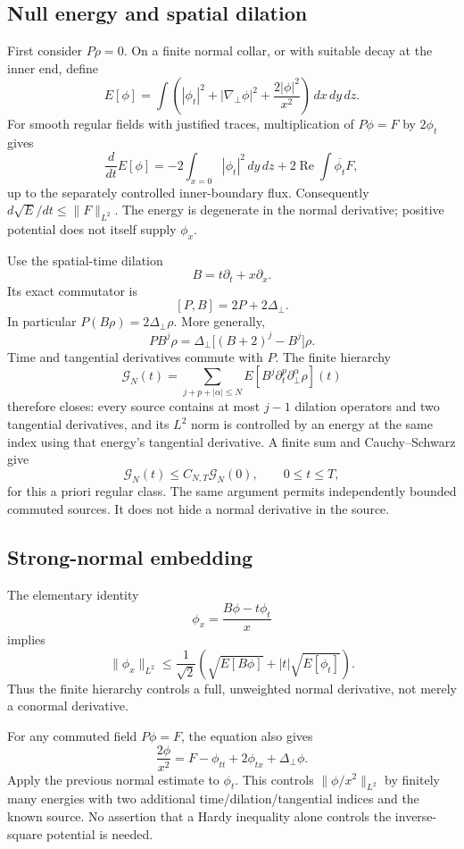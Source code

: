 \subsection{Null energy and spatial dilation}

First consider $P\rho=0$.  On a finite normal collar, or with suitable decay at
the inner end, define
\[
 E[\phi]=\int\left(|\phi_t|^2+|\nabla_\perp\phi|^2+
 \frac{2|\phi|^2}{x^2}\right)\,dx\,dy\,dz.
\]
For smooth regular fields with justified traces, multiplication of
$P\phi=F$ by $2\phi_t$ gives
\[
 \frac{d}{dt}E[\phi]
 =-2\int_{x=0}|\phi_t|^2\,dy\,dz
 +2\operatorname{Re}\int\overline{\phi_t}F,
\]
up to the separately controlled inner-boundary flux.  Consequently
$d\sqrt E/dt\leq\|F\|_{L^2}$.  The energy is degenerate in the normal
derivative; positive potential does not itself supply $\phi_x$.

Use the spatial-time dilation
\[
 B=t\partial_t+x\partial_x.
\]
Its exact commutator is
\[
 [P,B]=2P+2\Delta_\perp.
\]
In particular $P(B\rho)=2\Delta_\perp\rho$.  More generally,
\[
 P B^j\rho=\Delta_\perp\big[(B+2)^j-B^j\big]\rho.
\]
Time and tangential derivatives commute with $P$.  The finite hierarchy
\begin{equation}
 \mathcal G_N(t)=
 \sum_{j+p+|\alpha|\leq N}
 E[B^j\partial_t^p\partial_\perp^\alpha\rho](t)
 \label{eq:original-reference-graph-norm}
\end{equation}
therefore closes: every source contains at most $j-1$ dilation operators and
two tangential derivatives, and its $L^2$ norm is controlled by an energy at
the same index using that energy's tangential derivative.  A finite sum and
Cauchy--Schwarz give
\[
 \mathcal G_N(t)\leq C_{N,T}\mathcal G_N(0),\qquad 0\leq t\leq T,
\]
for this a priori regular class.  The same argument permits independently
bounded commuted sources.  It does not hide a normal derivative in the source.

\subsection{Strong-normal embedding}

The elementary identity
\[
 \phi_x=\frac{B\phi-t\phi_t}{x}
\]
implies
\[
 \|\phi_x\|_{L^2}\leq\frac1{\sqrt2}
 \left(\sqrt{E[B\phi]}+|t|\sqrt{E[\phi_t]}\right).
\]
Thus the finite hierarchy controls a full, unweighted normal derivative, not
merely a conormal derivative.

For any commuted field $P\phi=F$, the equation also gives
\[
 \frac{2\phi}{x^2}=F-\phi_{tt}+2\phi_{tx}+\Delta_\perp\phi.
\]
Apply the previous normal estimate to $\phi_t$.  This controls
$\|\phi/x^2\|_{L^2}$ by finitely many energies with two additional
time/dilation/tangential indices and the known source.  No assertion that a
Hardy inequality alone controls the inverse-square potential is needed.

